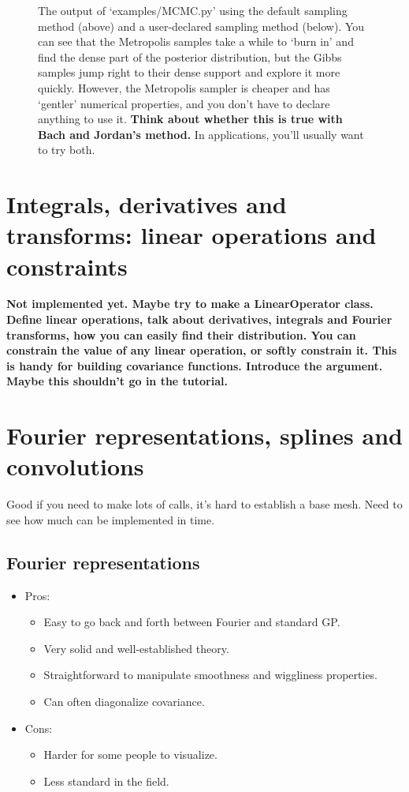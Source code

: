 \documentclass{manual}
\begin{document}
\begin{figure}
	\centering
	\caption{The output of {\sffamily `examples/MCMC.py'} using the default  sampling method (above) and a user-declared  sampling method (below). You can see that the Metropolis samples take a while to `burn in' and find the dense part of the posterior distribution, but the Gibbs samples jump right to their dense support and explore it more quickly. However, the Metropolis sampler is cheaper and has `gentler' numerical properties, and you don't have to declare anything to use it. \textbf{Think about whether this is true with Bach and Jordan's method.} In applications, you'll usually want to try both.}
	\label{fig:MCMCOutput}
\end{figure} 

\section{Integrals, derivatives and transforms: linear operations and constraints}\label{sec:linop} 

\textbf{Not implemented yet. Maybe try to make a LinearOperator class. Define linear operations, talk about derivatives, integrals and Fourier transforms, how you can easily find their distribution. You can constrain the value of any linear operation, or softly constrain it. This is handy for building covariance functions. Introduce the  argument. Maybe this shouldn't go in the tutorial.}



\section{Fourier representations, splines and convolutions}\label{sec:approx} 
Good if you need to make lots of calls, it's hard to establish a base mesh. Need to see how much can be implemented in time.

\subsection{Fourier representations}\label{sub:fourier}
\begin{itemize}
	\item Pros:
	\begin{itemize}
		\item Easy to go back and forth between Fourier and standard GP.
		\item Very solid and well-established theory.
		\item Straightforward to manipulate smoothness and wiggliness properties.
		\item Can often diagonalize covariance.
	\end{itemize}
	\item Cons:
	\begin{itemize}
		\item Harder for some people to visualize.
		\item Less standard in the field.
	\end{itemize}
\end{itemize}
\end{document}

